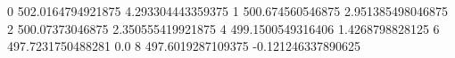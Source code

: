 0 502.0164794921875 4.293304443359375
1 500.674560546875 2.951385498046875
2 500.07373046875 2.350555419921875
4 499.1500549316406 1.4268798828125
6 497.7231750488281 0.0
8 497.6019287109375 -0.121246337890625
